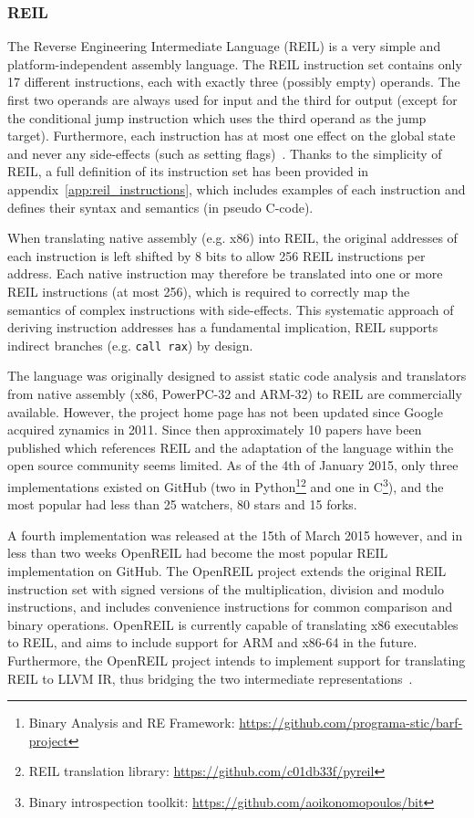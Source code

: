 
\subsubsection{REIL}
\label{sec:lit_review_reil}

The Reverse Engineering Intermediate Language (REIL) is a very simple and platform-independent assembly language. The REIL instruction set contains only 17 different instructions, each with exactly three (possibly empty) operands. The first two operands are always used for input and the third for output (except for the conditional jump instruction which uses the third operand as the jump target). Furthermore, each instruction has at most one effect on the global state and never any side-effects (such as setting flags)~\cite{reil_paper,reil_spec}. Thanks to the simplicity of REIL, a full definition of its instruction set has been provided in appendix~\ref{app:reil_instructions}, which includes examples of each instruction and defines their syntax and semantics (in pseudo C-code).

When translating native assembly (e.g. x86) into REIL, the original addresses of each instruction is left shifted by 8 bits to allow 256 REIL instructions per address. Each native instruction may therefore be translated into one or more REIL instructions (at most 256), which is required to correctly map the semantics of complex instructions with side-effects. This systematic approach of deriving instruction addresses has a fundamental implication, REIL supports indirect branches (e.g. \texttt{call rax}) by design.

The language was originally designed to assist static code analysis and translators from native assembly (x86, PowerPC-32 and ARM-32) to REIL are commercially available. However, the project home page has not been updated since Google acquired zynamics in 2011. Since then approximately 10 papers have been published which references REIL and the adaptation of the language within the open source community seems limited. As of the 4th of January 2015, only three implementations existed on GitHub (two in Python\footnote{Binary Analysis and RE Framework: \url{https://github.com/programa-stic/barf-project}}\footnote{REIL translation library: \url{https://github.com/c01db33f/pyreil}} and one in C\footnote{Binary introspection toolkit: \url{https://github.com/aoikonomopoulos/bit}}), and the most popular had less than 25 watchers, 80 stars and 15 forks.

A fourth implementation was released at the 15th of March 2015 however, and in less than two weeks OpenREIL had become the most popular REIL implementation on GitHub. The OpenREIL project extends the original REIL instruction set with signed versions of the multiplication, division and modulo instructions, and includes convenience instructions for common comparison and binary operations. OpenREIL is currently capable of translating x86 executables to REIL, and aims to include support for ARM and x86-64 in the future. Furthermore, the OpenREIL project intends to implement support for translating REIL to LLVM IR, thus bridging the two intermediate representations~\cite{openreil}.
